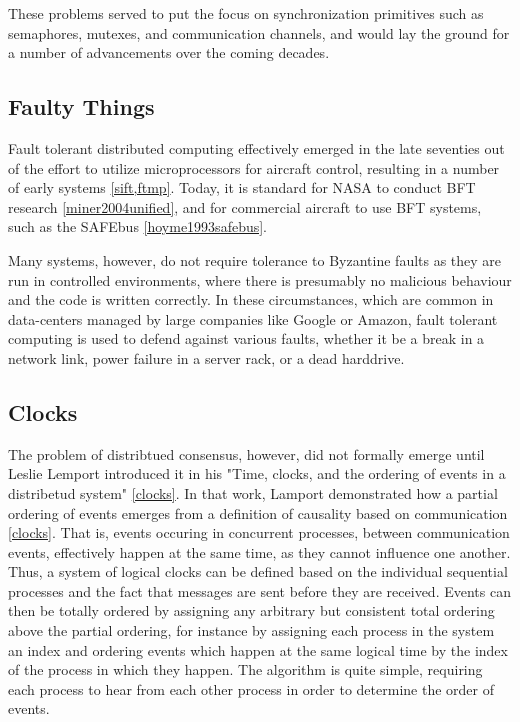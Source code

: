 These problems served to put the focus on synchronization primitives
such as semaphores, mutexes, and communication channels,
and would lay the ground for a number of advancements over the coming decades.

\subsection{Faulty Things}

Fault tolerant distributed computing effectively emerged in the late seventies 
out of the effort to utilize microprocessors for aircraft control, resulting in a number of early systems \ref{sift,ftmp}.
Today, it is standard for NASA to conduct BFT research \ref{miner2004unified}, 
and for commercial aircraft to use BFT systems, such as the SAFEbus \ref{hoyme1993safebus}.

Many systems, however, do not require tolerance to Byzantine faults as they are run in controlled environments,
where there is presumably no malicious behaviour and the code is written correctly.
In these circumstances, which are common in data-centers managed by large companies like Google or Amazon,
fault tolerant computing is used to defend against various faults,
whether it be a break in a network link, power failure in a server rack, or a dead harddrive.

\subsection{Clocks}

The problem of distribtued consensus, however, did not formally emerge until Leslie Lemport introduced it in his 
"Time, clocks, and the ordering of events in a distribetud system" \ref{clocks}.
In that work, Lamport demonstrated how a partial ordering of events emerges from a definition of causality based on communication \ref{clocks}.
That is, events occuring in concurrent processes, between communication events, 
effectively happen at the same time, as they cannot influence one another.
Thus, a system of logical clocks can be defined based on the individual sequential processes 
and the fact that messages are sent before they are received.
Events can then be totally ordered by assigning any arbitrary but consistent total ordering above the partial ordering,
for instance by assigning each process in the system an index and ordering events which happen at the same logical time by the
index of the process in which they happen.
The algorithm is quite simple, requiring each process to hear from each other process in order to determine the order of events.


